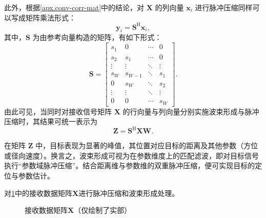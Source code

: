 此外，根据\cref{apx.conv-corr-mat}中的结论，对 $\mathbf{X}$ 的列向量 $\bm{x}_i$ 进行脉冲压缩同样可以写成矩阵乘法形式：
\[
    \bm{y}_i = \mathbf{S}^{\mathrm{H}}\bm{x}_i,
\]
其中，$\mathbf{S}$ 为由参考向量构造的矩阵，有如下形式：
\[
    \mathbf{S} =
    \begin{bmatrix}
        s_1    & 0       & \cdots & 0      \\
        s_2    & s_1     & \cdots & 0      \\
        \vdots & \vdots  & \ddots & \vdots \\
        s_W    & s_{W-1} & \ddots & s_1    \\
        0      & s_W     & \ddots & s_2    \\
        \vdots & \vdots  & \ddots & \vdots \\
        0      & 0       & \cdots & s_W
    \end{bmatrix}.
\]
由此可见，当同时对接收信号矩阵 $\mathbf{X}$ 的行向量与列向量分别实施波束形成与脉冲压缩时，其结果可统一表示为
\[
    \mathbf{Z} = \mathbf{S}^{\mathrm{H}} \mathbf{X}\mathbf{W}.
\]

在矩阵 $\mathbf{Z}$ 中，目标表现为显著的峰值，其位置对应目标的距离及其他参数（方位或径向速度）。换言之，波束形成可视为在参数维度上的匹配滤波，即对目标信号执行``参数域脉冲压缩''。结合距离维与参数维的双重脉冲压缩，便可实现目标的定位与参数估计。

\begin{example}
    对\cref{fig_data_x}中的接收数据矩阵\( \mathbf{X} \)进行脉冲压缩和波束形成处理。

    \begin{figure}[htb!]
        \centering
        \caption{接收数据矩阵\( \mathbf{X} \)（仅绘制了实部）}
        \label{fig_data_x}
    \end{figure}
\end{example}

